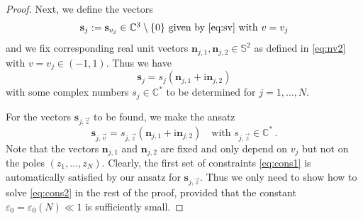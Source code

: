 \documentclass[11pt,reqno]{amsart}
\theoremstyle{definition}
\theoremstyle{remark}
\theoremstyle{remark}
\numberwithin{equation}{section}
\newcommand{\C}{\mathbb{C}}
\newcommand{\Ss}{\mathbb{S}}
\newcommand{\sv}{\mathbf{s}}
\newcommand{\nv}{\mathbf{n}}
\newcommand{\eps}{\varepsilon}
\newcommand{\ii}{\mathrm{i}}
\begin{document}
\begin{appendix}
\begin{proof}
Next, we define the vectors 
$$\sv_j:= \mbox{$\sv_{v_j} \in \C^3 \setminus \{0 \}$ given by \eqref{eq:sv} with $v=v_j$}
$$
and we fix corresponding real unit vectors $\nv_{j,1}, \nv_{j,2} \in \Ss^2$ as defined in \eqref{eq:nv2} with $v=v_j \in (-1,1)$. Thus we have
$$
\sv_{j} = s_j ( \nv_{j,1} + \ii \nv_{j,2})
$$ 
with some complex numbers $s_j \in \C^*$ to be determined for $j=1, \ldots, N$. 

For the vectors $\sv_{j,\vec{z}}$ to be found, we make the ansatz
$$
\sv_{j,\vec{v}} = s_{j,\vec{z}} ( \nv_{j,1} + \ii \nv_{j,2}) \quad \mbox{with $s_{j,\vec{z}} \in \C^*$} \, .
$$
Note that the vectors $\nv_{j,1}$ and $\nv_{j,2}$ are fixed and only depend on $v_j$ but not on the poles $(z_1, \ldots, z_N)$. Clearly, the first set of constraints \eqref{eq:cons1} is automatically satisfied by our ansatz for $\sv_{j,\vec{z}}$. Thus we only need to show how to solve \eqref{eq:cons2} in the rest of the proof, provided that the constant $\eps_0 =\eps_0(N) \ll 1$ is sufficiently small.


\end{proof}
\end{appendix}
\end{document}
